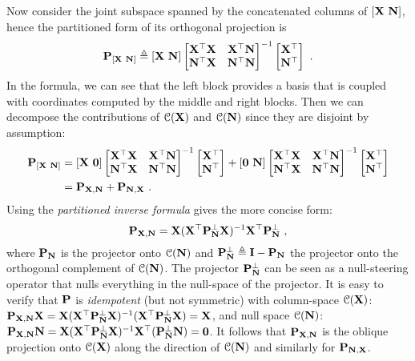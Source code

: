       Now consider the joint subspace spanned by the concatenated columns of $[\mathbf{X}~\mathbf{N}]$, hence the partitioned form of its orthogonal projection is
      \[
	  \mathbf{P}_{[\mathbf{X}~\mathbf{N}]}
	  \triangleq [\mathbf{X}~\mathbf{N}] \begin{bmatrix}  \mathbf{X}^\top\mathbf{X} & \mathbf{X}^\top\mathbf{N} \\ \mathbf{N}^\top\mathbf{X} & \mathbf{N}^\top\mathbf{N}  \end{bmatrix}^{-1} \begin{bmatrix}  \mathbf{X}^\top \\ \mathbf{N}^\top  \end{bmatrix} ~.
      \]
      In the formula, we can see that the left block provides a basis that is coupled with coordinates computed by the middle and right blocks. Then we can decompose the contributions of $\mathcal{C}(\mathbf{X})$ and $\mathcal{C}(\mathbf{N})$ since they are disjoint by assumption:
      \[
	\begin{split}
	  \mathbf{P}_{[\mathbf{X}~\mathbf{N}]} &= [\mathbf{X}~\mathbf{0}] \begin{bmatrix}  \mathbf{X}^\top\mathbf{X} & \mathbf{X}^\top\mathbf{N} \\ \mathbf{N}^\top\mathbf{X} & \mathbf{N}^\top\mathbf{N}  \end{bmatrix}^{-1} \begin{bmatrix}  \mathbf{X}^\top \\ \mathbf{N}^\top  \end{bmatrix} + [\mathbf{0}~\mathbf{N}] \begin{bmatrix}  \mathbf{X}^\top\mathbf{X} & \mathbf{X}^\top\mathbf{N} \\ \mathbf{N}^\top\mathbf{X} & \mathbf{N}^\top\mathbf{N}  \end{bmatrix}^{-1} \begin{bmatrix}  \mathbf{X}^\top \\ \mathbf{N}^\top  \end{bmatrix} \\
	  &= \mathbf{P}_{\mathbf{X,N}} + \mathbf{P}_{\mathbf{N,X}} ~.
	\end{split}
      \]
      Using the \textit{partitioned inverse formula} gives the more concise form:
      \begin{equation} \label{equ:app1_oblique_projection}
	\mathbf{P}_{\mathbf{X,N}} = \mathbf{X} ( \mathbf{X}^\top \mathbf{P}_{\mathbf{N}}^\perp \mathbf{X} )^{-1} \mathbf{X}^\top \mathbf{P}_{\mathbf{N}}^\perp ~,
      \end{equation}
      where $\mathbf{P}_{\mathbf{N}}$ is the projector onto $\mathcal{C}(\mathbf{N})$ and $\mathbf{P}_{\mathbf{N}}^\perp \triangleq \mathbf{I} - \mathbf{P}_{\mathbf{N}}$ the projector onto the orthogonal complement of $\mathcal{C}(\mathbf{N})$. The projector $\mathbf{P}_{\mathbf{N}}^\perp$ can be seen as a null-steering operator that nulls everything in the null-space of the projector. It is easy to verify that $\mathbf{P}$ is \emph{idempotent} (but not symmetric) with column-space $\mathcal{C}(\mathbf{X})$: $\mathbf{P}_{\mathbf{X,N}} \mathbf{X} = \mathbf{X} ( \mathbf{X}^\top \mathbf{P}_{\mathbf{N}}^\perp \mathbf{X} )^{-1} ( \mathbf{X}^\top \mathbf{P}_{\mathbf{N}}^\perp \mathbf{X}) = \mathbf{X}$, and null space $\mathcal{C}(\mathbf{N})$: $\mathbf{P}_{\mathbf{X,N}} \mathbf{N} = \mathbf{X} ( \mathbf{X}^\top \mathbf{P}_{\mathbf{N}}^\perp \mathbf{X} )^{-1} \mathbf{X}^\top (\mathbf{P}_{\mathbf{N}}^\perp \mathbf{N} ) = \mathbf{0}$. It follows that $\mathbf{P}_{\mathbf{X,N}}$ is the oblique projection onto $\mathcal{C}(\mathbf{X})$ along the direction of $\mathcal{C}(\mathbf{N})$ and similarly for $\mathbf{P}_{\mathbf{N,X}}$.

